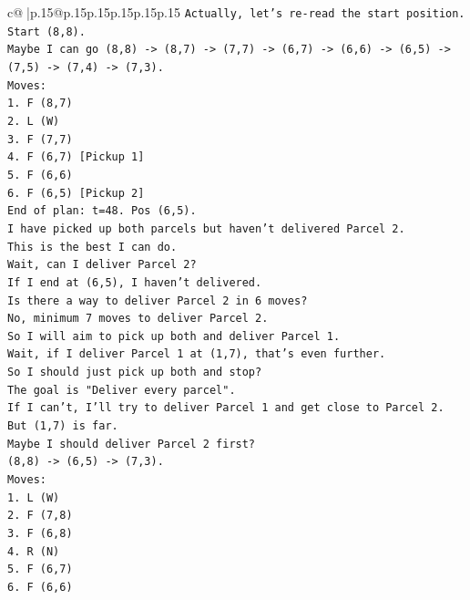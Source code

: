 \documentclass{article}
\begin{document}
{\begin{supertabular}{c@{$\;$}|p{.15\linewidth}@{}p{.15\linewidth}p{.15\linewidth}p{.15\linewidth}p{.15\linewidth}p{.15\linewidth}}
{{{\texttt{Actually, let's re{-}read the start position.} \\
\texttt{Start (8,8).} \\
\texttt{Maybe I can go (8,8) {-}> (8,7) {-}> (7,7) {-}> (6,7) {-}> (6,6) {-}> (6,5) {-}> (7,5) {-}> (7,4) {-}> (7,3).} \\
\texttt{Moves:} \\
\texttt{1. F (8,7)} \\
\texttt{2. L (W)} \\
\texttt{3. F (7,7)} \\
\texttt{4. F (6,7) {[}Pickup 1{]}} \\
\texttt{5. F (6,6)} \\
\texttt{6. F (6,5) {[}Pickup 2{]}} \\
\texttt{End of plan: t=48. Pos (6,5).} \\
\texttt{I have picked up both parcels but haven't delivered Parcel 2.} \\
\texttt{This is the best I can do.} \\
\texttt{Wait, can I deliver Parcel 2?} \\
\texttt{If I end at (6,5), I haven't delivered.} \\
\texttt{Is there a way to deliver Parcel 2 in 6 moves?} \\
\texttt{No, minimum 7 moves to deliver Parcel 2.} \\
\texttt{So I will aim to pick up both and deliver Parcel 1.} \\
\texttt{Wait, if I deliver Parcel 1 at (1,7), that's even further.} \\
\texttt{So I should just pick up both and stop?} \\
\texttt{The goal is "Deliver every parcel".} \\
\texttt{If I can't, I'll try to deliver Parcel 1 and get close to Parcel 2.} \\
\texttt{But (1,7) is far.} \\
\texttt{Maybe I should deliver Parcel 2 first?} \\
\texttt{(8,8) {-}> (6,5) {-}> (7,3).} \\
\texttt{Moves:} \\
\texttt{1. L (W)} \\
\texttt{2. F (7,8)} \\
\texttt{3. F (6,8)} \\
\texttt{4. R (N)} \\
\texttt{5. F (6,7)} \\
\texttt{6. F (6,6)} \\
}}}
\end{supertabular}}
\end{document}
